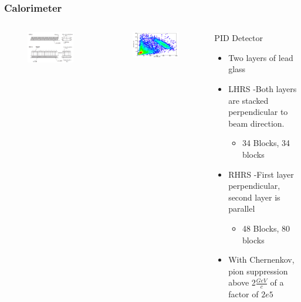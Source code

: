 \documentclass{beamer}
\begin{document}
\begin{frame}
\frametitle{Calorimeter}

\begin{columns}[t]
	\vspace{-25pt}
	\begin{figure}
		\includegraphics[width=6cm]{../images/calo}
	\end{figure}
	\vspace{-10pt}
	\begin{figure}
		\includegraphics[width=6cm]{../images/PR1_2}
	\end{figure}	

	\begin{block}{PID Detector}
	\begin{itemize}
		\item Two layers of lead glass
		\item LHRS -Both layers are stacked perpendicular to beam direction.
		\vspace{-13pt}
 		\begin{itemize}
			\item 34 Blocks, 34 blocks
		\end{itemize}
		\item RHRS -First layer perpendicular, second layer is parallel
		\begin{itemize}
			\item 48 Blocks, 80 blocks
		\end{itemize}
		\item With Chernenkov, pion suppression above 2$\frac{GeV}{c}$ of a factor of $2e5$ \cite{nim}
	\end{itemize}
	\end{block}
\end{columns}
\end{frame}
\end{document}
